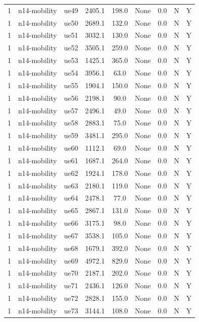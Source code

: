 \begin{table}[ht]
\begin{tabular}{|c|c|c|c|c|c|c|c|c|}
1 & n14-mobility & ue49 & 2405.1 & 198.0 & None & 0.0 & N & Y \\
1 & n14-mobility & ue50 & 2689.1 & 132.0 & None & 0.0 & N & Y \\
1 & n14-mobility & ue51 & 3032.1 & 130.0 & None & 0.0 & N & Y \\
1 & n14-mobility & ue52 & 3505.1 & 259.0 & None & 0.0 & N & Y \\
1 & n14-mobility & ue53 & 1425.1 & 365.0 & None & 0.0 & N & Y \\
1 & n14-mobility & ue54 & 3956.1 & 63.0 & None & 0.0 & N & Y \\
1 & n14-mobility & ue55 & 1904.1 & 150.0 & None & 0.0 & N & Y \\
1 & n14-mobility & ue56 & 2198.1 & 90.0 & None & 0.0 & N & Y \\
1 & n14-mobility & ue57 & 2496.1 & 49.0 & None & 0.0 & N & Y \\
1 & n14-mobility & ue58 & 2883.1 & 75.0 & None & 0.0 & N & Y \\
1 & n14-mobility & ue59 & 3481.1 & 295.0 & None & 0.0 & N & Y \\
1 & n14-mobility & ue60 & 1112.1 & 69.0 & None & 0.0 & N & Y \\
1 & n14-mobility & ue61 & 1687.1 & 264.0 & None & 0.0 & N & Y \\
1 & n14-mobility & ue62 & 1924.1 & 178.0 & None & 0.0 & N & Y \\
1 & n14-mobility & ue63 & 2180.1 & 119.0 & None & 0.0 & N & Y \\
1 & n14-mobility & ue64 & 2478.1 & 77.0 & None & 0.0 & N & Y \\
1 & n14-mobility & ue65 & 2867.1 & 131.0 & None & 0.0 & N & Y \\
1 & n14-mobility & ue66 & 3175.1 & 98.0 & None & 0.0 & N & Y \\
1 & n14-mobility & ue67 & 3538.1 & 105.0 & None & 0.0 & N & Y \\
1 & n14-mobility & ue68 & 1679.1 & 392.0 & None & 0.0 & N & Y \\
1 & n14-mobility & ue69 & 4972.1 & 829.0 & None & 0.0 & N & Y \\
1 & n14-mobility & ue70 & 2187.1 & 202.0 & None & 0.0 & N & Y \\
1 & n14-mobility & ue71 & 2436.1 & 126.0 & None & 0.0 & N & Y \\
1 & n14-mobility & ue72 & 2828.1 & 155.0 & None & 0.0 & N & Y \\
1 & n14-mobility & ue73 & 3144.1 & 108.0 & None & 0.0 & N & Y \\

\end{tabular}
\end{table}
